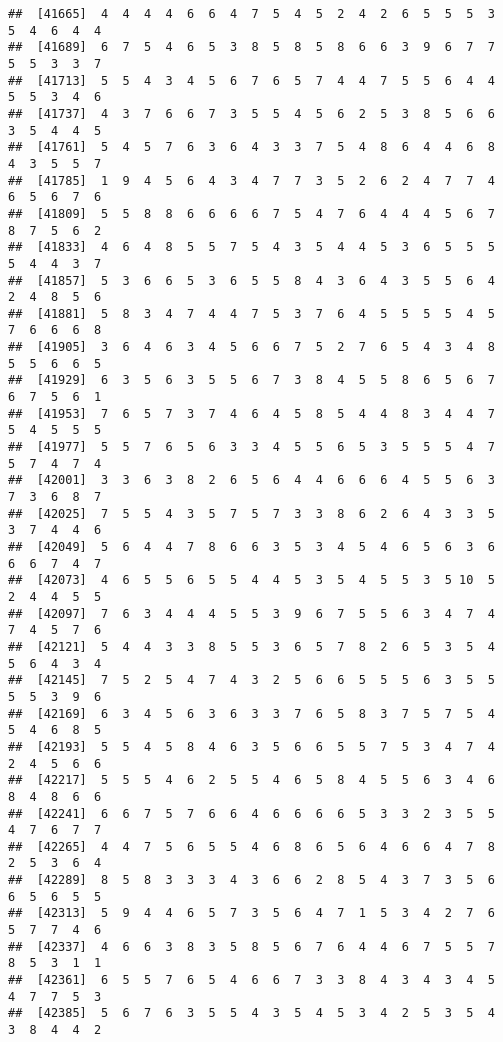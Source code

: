 \documentclass[
]{book}
\begin{document}
\begin{verbatim}
##  [41665]  4  4  4  4  6  6  4  7  5  4  5  2  4  2  6  5  5  5  3  5  4  6  4  4
##  [41689]  6  7  5  4  6  5  3  8  5  8  5  8  6  6  3  9  6  7  7  5  5  3  3  7
##  [41713]  5  5  4  3  4  5  6  7  6  5  7  4  4  7  5  5  6  4  4  5  5  3  4  6
##  [41737]  4  3  7  6  6  7  3  5  5  4  5  6  2  5  3  8  5  6  6  3  5  4  4  5
##  [41761]  5  4  5  7  6  3  6  4  3  3  7  5  4  8  6  4  4  6  8  4  3  5  5  7
##  [41785]  1  9  4  5  6  4  3  4  7  7  3  5  2  6  2  4  7  7  4  6  5  6  7  6
##  [41809]  5  5  8  8  6  6  6  6  7  5  4  7  6  4  4  4  5  6  7  8  7  5  6  2
##  [41833]  4  6  4  8  5  5  7  5  4  3  5  4  4  5  3  6  5  5  5  5  4  4  3  7
##  [41857]  5  3  6  6  5  3  6  5  5  8  4  3  6  4  3  5  5  6  4  2  4  8  5  6
##  [41881]  5  8  3  4  7  4  4  7  5  3  7  6  4  5  5  5  5  4  5  7  6  6  6  8
##  [41905]  3  6  4  6  3  4  5  6  6  7  5  2  7  6  5  4  3  4  8  5  5  6  6  5
##  [41929]  6  3  5  6  3  5  5  6  7  3  8  4  5  5  8  6  5  6  7  6  7  5  6  1
##  [41953]  7  6  5  7  3  7  4  6  4  5  8  5  4  4  8  3  4  4  7  5  4  5  5  5
##  [41977]  5  5  7  6  5  6  3  3  4  5  5  6  5  3  5  5  5  4  7  5  7  4  7  4
##  [42001]  3  3  6  3  8  2  6  5  6  4  4  6  6  6  4  5  5  6  3  7  3  6  8  7
##  [42025]  7  5  5  4  3  5  7  5  7  3  3  8  6  2  6  4  3  3  5  3  7  4  4  6
##  [42049]  5  6  4  4  7  8  6  6  3  5  3  4  5  4  6  5  6  3  6  6  6  7  4  7
##  [42073]  4  6  5  5  6  5  5  4  4  5  3  5  4  5  5  3  5 10  5  2  4  4  5  5
##  [42097]  7  6  3  4  4  4  5  5  3  9  6  7  5  5  6  3  4  7  4  7  4  5  7  6
##  [42121]  5  4  4  3  3  8  5  5  3  6  5  7  8  2  6  5  3  5  4  5  6  4  3  4
##  [42145]  7  5  2  5  4  7  4  3  2  5  6  6  5  5  5  6  3  5  5  5  5  3  9  6
##  [42169]  6  3  4  5  6  3  6  3  3  7  6  5  8  3  7  5  7  5  4  5  4  6  8  5
##  [42193]  5  5  4  5  8  4  6  3  5  6  6  5  5  7  5  3  4  7  4  2  4  5  6  6
##  [42217]  5  5  5  4  6  2  5  5  4  6  5  8  4  5  5  6  3  4  6  8  4  8  6  6
##  [42241]  6  6  7  5  7  6  6  4  6  6  6  6  5  3  3  2  3  5  5  4  7  6  7  7
##  [42265]  4  4  7  5  6  5  5  4  6  8  6  5  6  4  6  6  4  7  8  2  5  3  6  4
##  [42289]  8  5  8  3  3  3  4  3  6  6  2  8  5  4  3  7  3  5  6  6  5  6  5  5
##  [42313]  5  9  4  4  6  5  7  3  5  6  4  7  1  5  3  4  2  7  6  5  7  7  4  6
##  [42337]  4  6  6  3  8  3  5  8  5  6  7  6  4  4  6  7  5  5  7  8  5  3  1  1
##  [42361]  6  5  5  7  6  5  4  6  6  7  3  3  8  4  3  4  3  4  5  4  7  7  5  3
##  [42385]  5  6  7  6  3  5  5  4  3  5  4  5  3  4  2  5  3  5  4  3  8  4  4  2

\end{verbatim}
\end{document}
